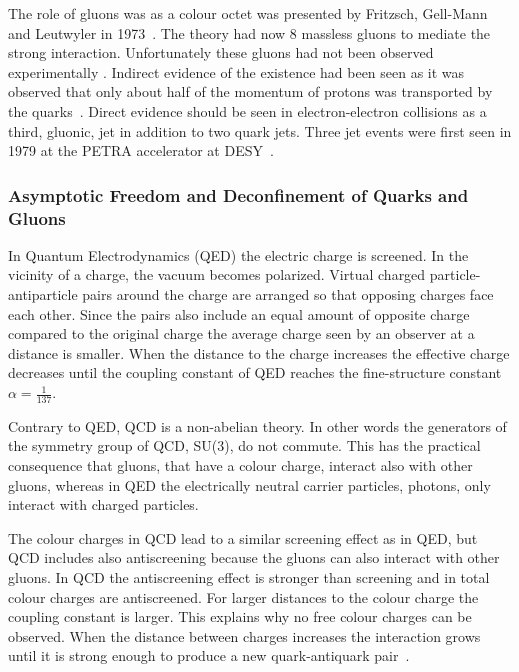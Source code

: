  The role of gluons was as a colour octet was presented by Fritzsch, Gell-Mann and Leutwyler in 1973~\cite{fritzsch1973advantages}. The theory had now 8 massless gluons to mediate the strong interaction. Unfortunately these gluons had not been observed experimentally . Indirect evidence of the existence had been seen as it was observed that only about half of the momentum of protons was transported by the quarks~\cite{25gluons}. Direct evidence should be seen in electron-electron collisions as a third, gluonic, jet in addition to two quark jets. Three jet events were first seen in 1979 at the PETRA accelerator at DESY~\cite{Brandelik1979243, PhysRev.43.830, Berger1979418}.

\pagebreak

\subsubsection{Asymptotic Freedom and Deconfinement of Quarks and Gluons}
In Quantum Electrodynamics (QED) the electric charge is screened. In the vicinity of a charge, the vacuum becomes polarized. Virtual charged particle-antiparticle pairs around the charge are arranged so that opposing charges face each other. Since the pairs also include an equal amount of opposite charge compared to the original charge the average charge seen by an observer at a distance is smaller. When the distance to the charge increases the effective charge decreases until the coupling constant of QED reaches the fine-structure constant $\alpha=\frac{1}{137}$. 

Contrary to QED, QCD is a non-abelian theory. In other words the generators of the symmetry group of QCD, SU(3), do not commute. This has the practical consequence that gluons, that have a colour charge, interact also with other gluons, whereas in QED the electrically neutral carrier particles, photons, only interact with charged particles.

The colour charges in QCD lead to a similar screening effect as in QED, but QCD includes also antiscreening because the gluons can also interact with other gluons. In QCD the antiscreening effect is stronger than screening and in total colour charges are antiscreened. For larger distances to the colour charge the coupling constant is larger. This explains why no free colour charges can be observed. When the distance between charges increases the interaction grows until it is strong enough to produce a new quark-antiquark pair~\cite{Alkofer:2006fu}. 

